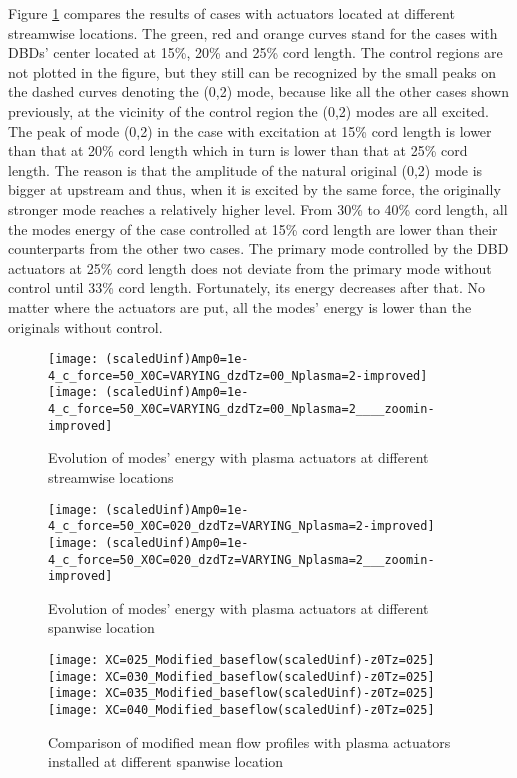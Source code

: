 \documentclass{AIAA}
\begin{document}
Figure \ref{f:streamwiselocationeffect} compares the results of cases with actuators located at different streamwise locations. The green, red and orange curves stand for the cases with DBDs' center located at 15\%, 20\% and 25\% cord length. The control regions are not plotted in the figure, but they still can be recognized by the small peaks on the dashed curves denoting the (0,2) mode, because like all the other cases shown previously, at the vicinity of the control region the (0,2) modes are all excited. The peak of mode (0,2) in the case with excitation at 15\% cord length is lower than that at 20\% cord length which in turn is lower than that at 25\% cord length. The reason is that the amplitude of the natural original (0,2) mode is bigger at upstream and thus, when it is excited by the same force, the originally stronger mode reaches a relatively higher level. From 30\% to 40\% cord length, all the modes energy of the case controlled at 15\% cord length are lower than their counterparts from the other two cases. The primary mode controlled by the DBD actuators at 25\% cord length does not deviate from the primary mode without control until 33\% cord length. Fortunately, its energy decreases after that. No matter where the actuators are put, all the modes' energy is lower than the originals without control.
\begin{figure}
\centering
\texttt{[image: (scaledUinf)Amp0=1e-4\_c\_force=50\_X0C=VARYING\_dzdTz=00\_Nplasma=2-improved]}
\texttt{[image: (scaledUinf)Amp0=1e-4\_c\_force=50\_X0C=VARYING\_dzdTz=00\_Nplasma=2\_\_\_\_zoomin-improved]}
\caption{Evolution of modes' energy with plasma actuators at different streamwise locations}%
\label{f:streamwiselocationeffect}
\end{figure}
\begin{figure}
\centering
\texttt{[image: (scaledUinf)Amp0=1e-4\_c\_force=50\_X0C=020\_dzdTz=VARYING\_Nplasma=2-improved]}
\texttt{[image: (scaledUinf)Amp0=1e-4\_c\_force=50\_X0C=020\_dzdTz=VARYING\_Nplasma=2\_\_\_zoomin-improved]}
\caption{Evolution of modes' energy with plasma actuators at different spanwise location}%
\label{f:spanwiselocationeffect}
\end{figure}
\begin{figure}
\centering
\texttt{[image: XC=025\_Modified\_baseflow(scaledUinf)-z0Tz=025]}
\texttt{[image: XC=030\_Modified\_baseflow(scaledUinf)-z0Tz=025]}
\texttt{[image: XC=035\_Modified\_baseflow(scaledUinf)-z0Tz=025]}
\texttt{[image: XC=040\_Modified\_baseflow(scaledUinf)-z0Tz=025]}
\caption{Comparison of modified mean flow profiles with plasma actuators installed at different spanwise location}%
\label{f:Wt_SpVar}
\end{figure}
\end{document}
